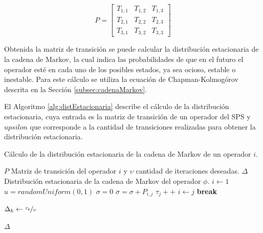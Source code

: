\begin{equation} \label{eq:matrizTransicionPredictive}
	P =
	\begin{bmatrix}
		T_{1,1} & T_{1,2} & T_{1,3} \\
		T_{2,1} & T_{2,2} & T_{2,3} \\
		T_{3,1} & T_{3,2} & T_{3,3}
	\end{bmatrix}	
\end{equation}

Obtenida la matriz de transici\'on se puede calcular la distribuci\'on estacionaria de la cadena de Markov, la cual indica las probabilidades de que en el futuro el operador est\'e en cada uno de los posibles estados, ya sea ocioso, estable o inestable. Para este c\'alculo se utiliza la ecuaci\'on de Chapman-Kolmog\'orov \citep{Papoulis1984} descrita en la Secci\'on \ref{subsec:cadenaMarkov}.

El Algoritmo \ref{alg:distEstacionaria} describe el c\'alculo de la distribuci\'on estacionaria, cuya entrada es la matriz de transici\'on de un operador del SPS y $upsilon$ que corresponde a la cantidad de transiciones realizadas para obtener la distribuci\'on estacionaria. 

\begin{algorithm}[!t]
	\caption{C\'alculo de la distribuci\'on estacionaria de la cadena de Markov de un operador $i$.}
	\label{alg:distEstacionaria}
	\begin{algorithmic}[1]
	\REQUIRE $P$ Matriz de transici\'on del operador $i$ y $\upsilon$ cantidad de iteraciones deseadas.
	\ENSURE $\Delta$ Distribuci\'on estacionaria de la cadena de Markov del operador $\phi$.
	\STATE $i \leftarrow 1$
		\STATE $u = randomUniform(0,1)$
		\STATE $\sigma = 0$
			\STATE $\sigma = \sigma + P_{i,j}$
				\STATE $\tau_{j}++$
				\STATE $i \leftarrow j$
				\STATE \textbf{break}
			\ENDIF
		\ENDFOR
	\ENDFOR

		\STATE $\Delta_{k} \leftarrow \nicefrac{\tau_{k}}{\upsilon}$
	\ENDFOR	
	
	\RETURN $\Delta$
	
	\end{algorithmic}
\end{algorithm}


